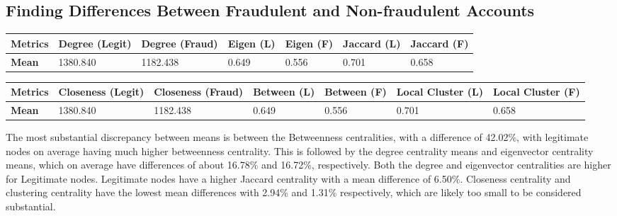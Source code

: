 \documentclass{styles/svproc}
\begin{document}
\bigskip
{}

\subsection{Finding Differences Between Fraudulent and Non-fraudulent Accounts}

\smallskip
\begin{tabular}{ | m{1.55cm} | m{1.65cm}| m{1.65cm}| m{1.65cm}| m{1.65cm}| m{1.65cm}| m{1.65cm}|}
  \hline
  \textbf{Metrics} & \textbf{Degree (Legit)} & \textbf{Degree (Fraud)} & \textbf{Eigen (L)} & \textbf{Eigen (F)} & \textbf{Jaccard (L)} & \textbf{Jaccard (F)}\\ 
  \hline
  \textbf{Mean} & 1380.840 & 1182.438 & 0.649 & 0.556 & 0.701 & 0.658\\ 
  \hline
\end{tabular}

\bigskip
{}

\smallskip
\noindent
\begin{tabular}{ | m{1.55cm} | m{1.7cm}| m{1.7cm}| m{1.6cm}| m{1.6cm}| m{1.7cm}| m{1.7cm}|}
\hline
\textbf{Metrics} & \textbf{Closeness (Legit)} & \textbf{Closeness (Fraud)} & \textbf{Between (L)} & \textbf{Between (F)} & \textbf{Local Cluster (L)} & \textbf{Local Cluster (F)}\\ 
\hline
\textbf{Mean} & 1380.840 & 1182.438 & 0.649 & 0.556 & 0.701 & 0.658\\ 
\hline
\end{tabular}

\bigskip
{}

\bigskip
\noindent The most substantial discrepancy between means is between the Betweenness centralities, with a difference of 42.02\%, with legitimate nodes on average having much higher betweenness centrality. This is followed by the degree centrality means and eigenvector centrality means, which on average have differences of about 16.78\% and 16.72\%, respectively. Both the degree and eigenvector centralities are higher for Legitimate nodes. Legitimate nodes have a higher Jaccard centrality with a mean difference of 6.50\%. Closeness centrality and clustering centrality have the lowest mean differences with 2.94\% and 1.31\% respectively, which are likely too small to be considered substantial.
\end{document}
